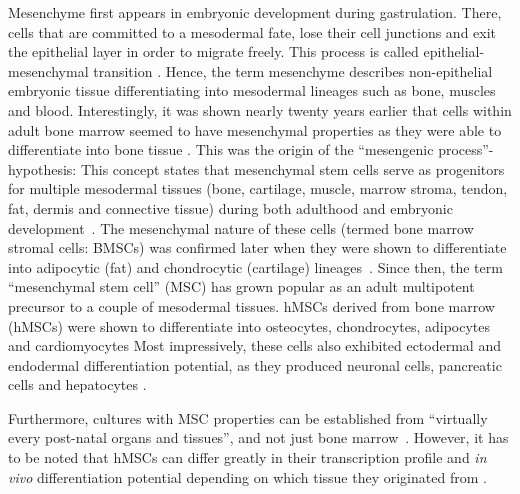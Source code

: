 Mesenchyme first appears in embryonic development during gastrulation. There,
cells that are committed to a mesodermal fate, lose their cell junctions and
exit the epithelial layer in order to migrate freely. This process is called
epithelial-mesenchymal transition
\cite{tamFormationMesodermalTissues1987,nowotschinCellularDynamicsEarly2010}.
Hence, the term mesenchyme describes non-epithelial embryonic tissue
differentiating into mesodermal lineages such as bone, muscles and blood.
Interestingly, it was shown nearly twenty years earlier that cells within adult
bone marrow seemed to have mesenchymal properties as they were able to
differentiate into bone tissue
\cite{friedensteinOsteogenesisTransplantsBone1966,friedensteinOsteogenicPrecursorCells1971,biancoMesenchymalStemCells2014}.
This was the origin of the ``mesengenic process''-hypothesis: This concept
states that mesenchymal stem cells serve as progenitors for multiple mesodermal
tissues (bone, cartilage, muscle, marrow stroma, tendon, fat, dermis and
connective tissue) during both adulthood and embryonic
development~\cite{caplanMesenchymalStemCells1991,caplanMesengenicProcess1994}.
The mesenchymal nature of these cells (termed bone marrow stromal cells: BMSCs)
was confirmed later when they were shown to differentiate into adipocytic (fat)
and chondrocytic (cartilage)
lineages~\cite{pittengerMultilineagePotentialAdult1999}. Since then, the term
``mesenchymal stem cell'' (MSC) has grown popular as an adult multipotent
precursor to a couple of mesodermal tissues. hMSCs derived from bone marrow
(hMSCs) were shown to differentiate into osteocytes, chondrocytes, adipocytes
and cardiomyocytes
\cite{gronthosSTRO1FractionAdult1994,muruganandanAdipocyteDifferentiationBone2009,xuMesenchymalStemCells2004}
Most impressively, these cells also exhibited
ectodermal and endodermal differentiation potential, as they produced
neuronal cells, pancreatic cells and hepatocytes
\cite{barzilayLentiviralDeliveryLMX1a2009,wilkinsHumanBoneMarrowderived2009,gabrInsulinproducingCellsAdult2013,stockHumanBoneMarrow2014}.

Furthermore, cultures with MSC properties can be established from ``virtually
every post-natal organs and tissues'', and not just bone
marrow~\cite{dasilvameirellesMesenchymalStemCells2006}. However, it has to be
noted that hMSCs can differ greatly in their transcription profile and
\textit{in vivo} differentiation potential depending on which tissue they
originated from
\cite{jansenFunctionalDifferencesMesenchymal2010,sacchettiNoIdenticalMesenchymal2016}.

